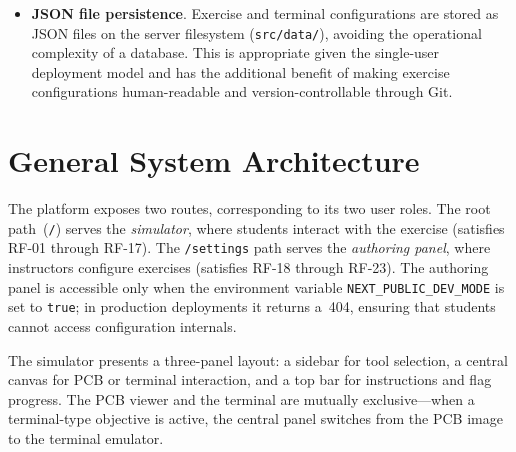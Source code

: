 \begin{itemize}
    \item \textbf{JSON file persistence}. Exercise and terminal configurations are stored as JSON files on the server filesystem (\texttt{src/data/}), avoiding the operational complexity of a database. This is appropriate given the single-user deployment model and has the additional benefit of making exercise configurations human-readable and version-controllable through Git.
\end{itemize}

\section{General System Architecture}\label{sec:sysarch}

The platform exposes two routes, corresponding to its two user roles. The root path~(\texttt{/}) serves the \emph{simulator}, where students interact with the exercise (satisfies RF-01 through RF-17). The \texttt{/settings} path serves the \emph{authoring panel}, where instructors configure exercises (satisfies RF-18 through RF-23). The authoring panel is accessible only when the environment variable \texttt{NEXT\_PUBLIC\_DEV\_MODE} is set to \texttt{true}; in production deployments it returns a~404, ensuring that students cannot access configuration internals.

The simulator presents a three-panel layout: a sidebar for tool selection, a central canvas for PCB or terminal interaction, and a top bar for instructions and flag progress. The PCB viewer and the terminal are mutually exclusive---when a terminal-type objective is active, the central panel switches from the PCB image to the terminal emulator.

